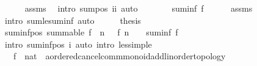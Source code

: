\begin{isabellebody}
\ \ \ \ \isamarkupfalse%
\ assms\ \isamarkupfalse%
\ {\isacharparenleft}{\kern0pt}intro\ sum{\isacharunderscore}{\kern0pt}pos{}{\isacharbrackleft}{\kern0pt}\ i{\isacharequal}{\kern0pt}i{\isacharbrackright}{\kern0pt}{\isacharparenright}{\kern0pt}\ auto\isanewline
\ \ \isamarkupfalse%
\ \isamarkupfalse%
\ {\isachardoublequoteopen}{\isasymdots}\ {\isasymle}\ suminf\ f{\isachardoublequoteclose}\isanewline
\ \ \ \ \isamarkupfalse%
\ assms\ \isamarkupfalse%
\ {\isacharparenleft}{\kern0pt}intro\ sum{\isacharunderscore}{\kern0pt}le{\isacharunderscore}{\kern0pt}suminf{\isacharparenright}{\kern0pt}\ auto\isanewline
\ \ \isamarkupfalse%
\ \isamarkupfalse%
\ {\isacharquery}{\kern0pt}thesis\ \isacommand{{\isachardot}{\kern0pt}}\isamarkupfalse%
\isanewline
{}\isamarkupfalse%
%
\endisatagproof
{\isafoldproof}%
%
\isadelimproof
\isanewline
%
\endisadelimproof
\isanewline
{}\isamarkupfalse%
\ suminf{\isacharunderscore}{\kern0pt}pos{\isacharcolon}{\kern0pt}\ {\isachardoublequoteopen}summable\ f\ {\isasymLongrightarrow}\ {\isacharparenleft}{\kern0pt}{\isasymAnd}n{\isachardot}{\kern0pt}\ {}\ {\isacharless}{\kern0pt}\ f\ n{\isacharparenright}{\kern0pt}\ {\isasymLongrightarrow}\ {}\ {\isacharless}{\kern0pt}\ suminf\ f{\isachardoublequoteclose}\isanewline
%
\isadelimproof
\ \ %
\endisadelimproof
%
\isatagproof
{}\isamarkupfalse%
\ {\isacharparenleft}{\kern0pt}intro\ suminf{\isacharunderscore}{\kern0pt}pos{}{\isacharbrackleft}{\kern0pt}\ i{\isacharequal}{\kern0pt}{}{\isacharbrackright}{\kern0pt}{\isacharparenright}{\kern0pt}\ {\isacharparenleft}{\kern0pt}auto\ intro{\isacharcolon}{\kern0pt}\ less{\isacharunderscore}{\kern0pt}imp{\isacharunderscore}{\kern0pt}le{\isacharparenright}{\kern0pt}%
\endisatagproof
{\isafoldproof}%
%
\isadelimproof
\isanewline
%
\endisadelimproof
\isanewline
{}\isamarkupfalse%
\isanewline
\isanewline
{}\isamarkupfalse%
\isanewline
\ \ \ f\ {\isacharcolon}{\kern0pt}{\isacharcolon}{\kern0pt}\ {\isachardoublequoteopen}nat\ {\isasymRightarrow}\ {\isacharprime}{\kern0pt}a{\isacharcolon}{\kern0pt}{\isacharcolon}{\kern0pt}{\isacharbraceleft}{\kern0pt}ordered{\isacharunderscore}{\kern0pt}cancel{\isacharunderscore}{\kern0pt}comm{\isacharunderscore}{\kern0pt}monoid{\isacharunderscore}{\kern0pt}add{\isacharcomma}{\kern0pt}linorder{\isacharunderscore}{\kern0pt}topology{\isacharbraceright}{\kern0pt}{\isachardoublequoteclose}\isanewline

\end{isabellebody}
